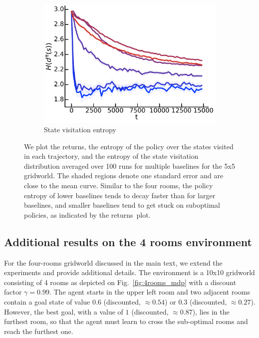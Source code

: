 \begin{figure}[!ht]
\begin{subfigure}[b]{0.32\linewidth}
    \includegraphics[width=\textwidth]{articles/baselines/figs/5x5_plots/entropy_ds}
    \caption{State visitation entropy}
    \label{fig:5x5_state}
  \end{subfigure}
 
  \caption{We plot the returns, the entropy of the policy over the states visited in each trajectory, and the entropy of the state visitation distribution averaged over 100 runs for multiple baselines for the 5x5 gridworld. The shaded regions denote one standard error and are close to the mean curve. Similar to the four rooms, the policy entropy of lower baselines tends to decay faster than for larger baselines, and smaller baselines tend to get stuck on suboptimal policies, as indicated by the returns~plot.~\label{fig:5x5_stats}}
\end{figure}

\subsection{Additional results on the 4 rooms environment}
\label{app:4rooms_mdp}
For the four-rooms gridworld discussed in the main text, we extend the experiments and provide additional details.
The environment is a 10x10 gridworld consisting of 4 rooms as depicted on Fig.~\ref{fig:4rooms_mdp} with a discount factor $\gamma=0.99$. The agent starts in the upper left room and two adjacent rooms contain a goal state of value $0.6$ (discounted, $\approx0.54$) or $0.3$ (discounted, $\approx0.27$). However, the best goal, with a value of $1$ (discounted, $\approx0.87$), lies in the furthest room, so that the agent must learn to cross the sub-optimal rooms and reach the furthest one. 

